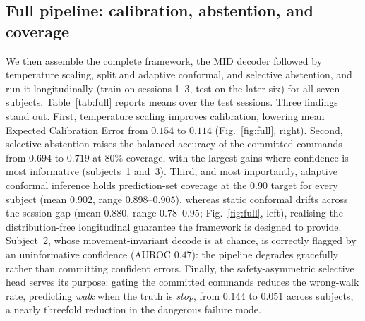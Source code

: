 \documentclass[conference]{IEEEtran}
\begin{document}
\subsection{Full pipeline: calibration, abstention, and coverage}
We then assemble the complete framework, the MID decoder followed by temperature
scaling, split and adaptive conformal, and selective abstention, and run it
longitudinally (train on sessions 1--3, test on the later six) for all seven
subjects. Table~\ref{tab:full} reports means over the test sessions. Three findings
stand out. First, temperature scaling improves calibration, lowering mean Expected
Calibration Error from $0.154$ to $0.114$ (Fig.~\ref{fig:full}, right). Second,
selective abstention raises the balanced accuracy of the committed commands from
$0.694$ to $0.719$ at $80\%$ coverage, with the largest gains where confidence is
most informative (subjects~1 and~3). Third, and most importantly, adaptive conformal
inference holds prediction-set coverage at the $0.90$ target for every subject (mean
$0.902$, range $0.898$--$0.905$), whereas static conformal drifts across the session
gap (mean $0.880$, range $0.78$--$0.95$; Fig.~\ref{fig:full}, left), realising the
distribution-free longitudinal guarantee the framework is designed to provide.
Subject~2, whose movement-invariant decode is at chance, is correctly flagged by an
uninformative confidence (AUROC $0.47$): the pipeline degrades gracefully rather
than committing confident errors. Finally, the safety-asymmetric selective head
serves its purpose: gating the committed commands reduces the wrong-walk rate,
predicting \emph{walk} when the truth is \emph{stop}, from $0.144$ to $0.051$ across
subjects, a nearly threefold reduction in the dangerous failure mode.
\end{document}
